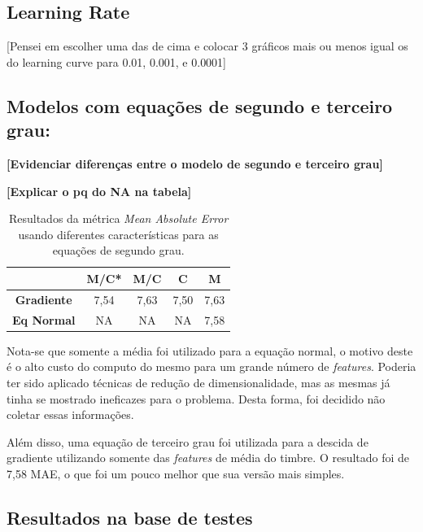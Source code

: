 \documentclass[conference]{IEEEtran}
\begin{document}
\subsection{Learning Rate}

[Pensei em escolher uma das de cima e colocar 3 gráficos mais ou menos igual os do learning curve para 0.01, 0.001, e 0.0001]

\subsection{Modelos com equações de segundo e terceiro grau: }

\textbf{[Evidenciar diferenças entre o modelo de segundo e terceiro grau]}

\textbf{[Explicar o pq do NA na tabela]}

\begin{table}[!h]
	\centering
	
	\begin{tabular}{ccccc} \\ \hline
		\backslashbox{\textbf{Modelos}}{\textbf{Features}} & \textbf{M/C*} & \textbf{M/C} & \textbf{C} & \textbf{M} \\ \hline
		\textbf{Gradiente}      & 7,54     & 7,63         & 7,50       & 7,63  \\  
		\textbf{Eq Normal}      & NA       & NA         & NA       & 7,58   
	\end{tabular}
	\caption{Resultados da métrica \textit{Mean Absolute Error} usando diferentes características para as equações de segundo grau.}
	\label{tab:comp}
\end{table}

Nota-se que somente a média foi utilizado para a equação normal, o motivo deste é o alto custo do computo do mesmo para um grande número de \emph{features}. Poderia ter sido aplicado técnicas de redução de dimensionalidade, mas as mesmas já tinha se mostrado ineficazes para o problema. Desta forma, foi decidido não coletar essas informações.

Além disso, uma equação de terceiro grau foi utilizada para a descida de gradiente utilizando somente das \emph{features} de média do timbre. O resultado foi de 7,58 MAE, o que foi um pouco melhor que sua versão mais simples.

\subsection{Resultados na base de testes }
\end{document}
